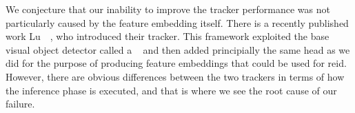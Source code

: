 We conjecture that our inability to improve the tracker performance was not particularly caused by the feature embedding itself. There is a recently published work Lu~\etal{}~\cite{lu2020retinetrack}, who introduced their \retinatrack{} tracker. This framework exploited the base visual object detector called a \retinanet{}~\cite{lin2018focal} and then added principially the same head as we did for the purpose of producing feature embeddings that could be used for \gls{reid}. However, there are obvious differences between the two trackers in terms of how the inference phase is executed, and that is where we see the root cause of our failure.
